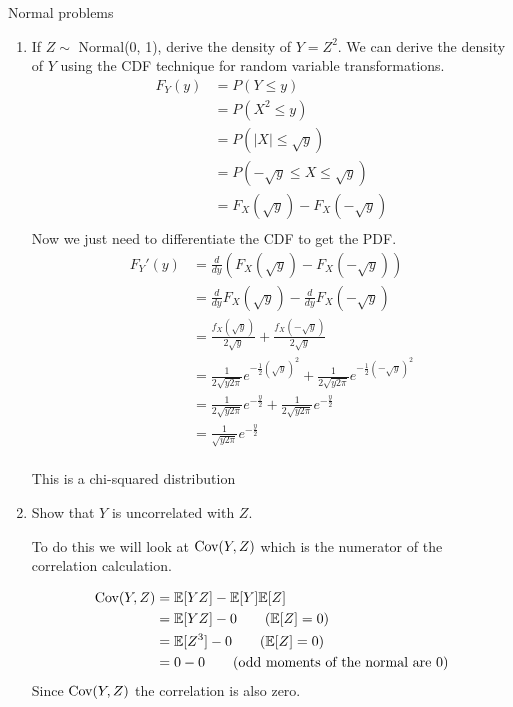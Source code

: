 Normal problems
\begin{enumerate}
\item If $Z \sim $ Normal(0, 1), derive the density of $Y = Z^2$.
    We can derive the density of $Y$ using the CDF technique for random variable transformations.
    \begin{align*}
        F_Y(y) &= P(Y \leq y)\\
               &= P(X^2 \leq y)\\
               &= P( |X| \leq \sqrt{y})\\
               &= P(-\sqrt{y} \leq X \leq \sqrt{y})\\
               &= F_X(\sqrt{y})-F_X(-\sqrt{y})\\
    \end{align*}
    Now we just need to differentiate the CDF to get the PDF.
    \begin{align*}
        F_Y'(y) &= \frac{d}{dy}({F_X(\sqrt{y})-F_X(-\sqrt{y})})\\
                &= \frac{d}{dy}{F_X(\sqrt{y})-\frac{d}{dy}F_X(-\sqrt{y})}\\
                &= \frac{f_X(\sqrt{y})}{2\sqrt{y}}+\frac{f_X(-\sqrt{y})}{2\sqrt{y}}\\
                &= \frac{1}{2\sqrt{y2\pi}}e^{-\frac{1}{2}(\sqrt{y})^2}+\frac{1}{2\sqrt{y2\pi}}e^{-\frac{1}{2}(-\sqrt{y})^2}\\
                &= \frac{1}{2\sqrt{y2\pi}}e^{-\frac{y}{2}}+\frac{1}{2\sqrt{y2\pi}}e^{-\frac{y}{2}}\\
                &= \frac{1}{\sqrt{y2\pi}}e^{-\frac{y}{2}}\\
    \end{align*}

    This is a chi-squared distribution

\item Show that $Y$ is uncorrelated with $Z$.

    To do this we will look at $\text{Cov}(Y, Z)$ which is the numerator of the correlation calculation.

    \begin{align*}
        \cov{Y}{Z} &= \expec{YZ} - \expec{Y}\expec{Z}\\
                   &= \expec{YZ} - 0\tag*{($\expec{Z}= 0$)}\\
                   &= \expec{Z^3} - 0\tag*{($\expec{Z}= 0$)}\\
                   &= 0 - 0\tag*{(odd moments of the normal are 0)}\\
    \end{align*}
    Since $\text{Cov}(Y, Z)$ the correlation is also zero.
\end{enumerate}
